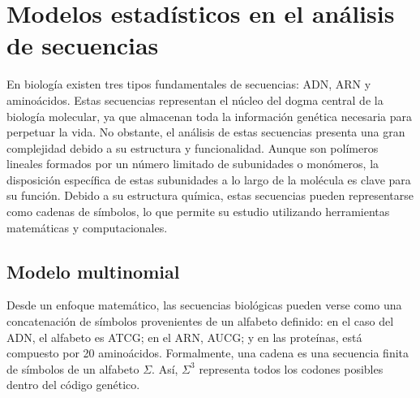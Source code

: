 \chapter{Modelos estadísticos en el análisis de secuencias}
En biología existen tres tipos fundamentales de secuencias: ADN, ARN y aminoácidos. Estas secuencias representan el núcleo del dogma central de la biología molecular, ya que almacenan toda la información genética necesaria para perpetuar la vida. No obstante, el análisis de estas secuencias presenta una gran complejidad debido a su estructura y funcionalidad. Aunque son polímeros lineales formados por un número limitado de subunidades o monómeros, la disposición específica de estas subunidades a lo largo de la molécula es clave para su función. Debido a su estructura química, estas secuencias pueden representarse como cadenas de símbolos, lo que permite su estudio utilizando herramientas matemáticas y computacionales.

\section{Modelo multinomial}
Desde un enfoque matemático, las secuencias biológicas pueden verse como una concatenación de símbolos provenientes de un alfabeto definido: en el caso del ADN, el alfabeto es ATCG; en el ARN, AUCG; y en las proteínas, está compuesto por 20 aminoácidos. Formalmente, una cadena es una secuencia finita de símbolos de un alfabeto $\Sigma$. Así, $\Sigma^3$ representa todos los codones posibles dentro del código genético.

